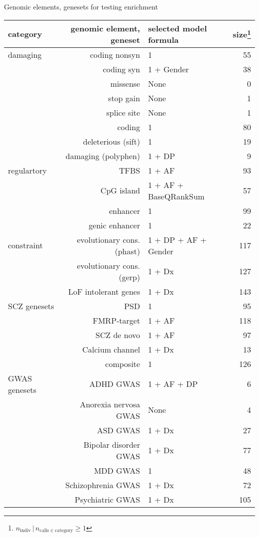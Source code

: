\documentclass[usenames,dvipsnames]{beamer}
\begin{document}
\begin{frame}{Genomic elements, genesets for testing enrichment}
\begin{center}
\tiny
\begin{tabular}{lrlr}
category & genomic element, geneset & selected model formula & size\footnote{\(n_\mathrm{indiv} \,|\, n_{\mathrm{calls} \in \mathrm{category}} \ge 1\)} \\
\hline
\hline
damaging & coding nonsyn & 1 & 55 \\
& coding syn & 1 + Gender & 38 \\
& missense & None & 0 \\
& stop gain & None & 1 \\
& splice site & None & 1 \\
& coding & 1 & 80 \\
& deleterious (sift) & 1 & 19 \\
& damaging (polyphen) & 1 + DP & 9 \\
\hline
regulartory & TFBS & 1 + AF & 93 \\
& CpG island & 1 + AF + BaseQRankSum & 57 \\
& enhancer & 1 & 99 \\
& genic enhancer & 1 & 22 \\
\hline
constraint & evolutionary cons. (phast) & 1 + DP + AF + Gender & 117 \\
& evolutionary cons. (gerp) & 1 + Dx & 127 \\
& LoF intolerant genes & 1 + Dx & 143 \\
\hline
SCZ genesets & PSD & 1 & 95 \\
& FMRP-target & 1 + AF & 118 \\
& SCZ de novo & 1 + AF & 97 \\
& Calcium channel & 1 + Dx & 13 \\
& composite & 1 & 126 \\
\hline
GWAS genesets & ADHD GWAS & 1 + AF + DP & 6 \\
& Anorexia nervosa GWAS & None & 4 \\
& ASD GWAS & 1 + Dx & 27 \\
& Bipolar disorder GWAS & 1 + Dx & 77 \\
& MDD GWAS & 1 & 48 \\
& Schizophrenia GWAS & 1 + Dx & 72 \\
& Psychiatric GWAS & 1 + Dx & 105 \\
\end{tabular}
\end{center}
\end{frame}
\end{document}
